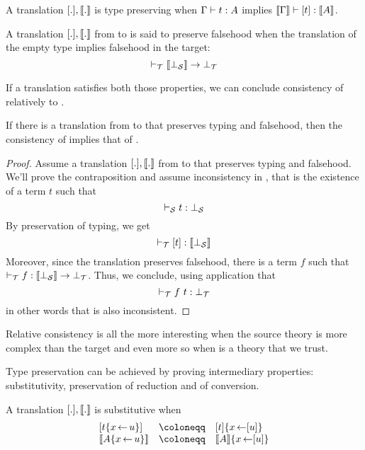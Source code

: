 \begin{definition}
  A translation \([.], \llbracket . \rrbracket\) is type preserving when
  \(\Gamma \vdash t : A\) implies \(\llbracket \Gamma \rrbracket \vdash [t] : \llbracket A \rrbracket\).
\end{definition}

\begin{definition}
  A translation \([.], \llbracket . \rrbracket\) from \cS to \cT is said to preserve
  falsehood when the translation of the empty type implies falsehood in the
  target:
  \[ \vdash_\mathcal{T} \llbracket \bot_\mathcal{S} \rrbracket \to \bot_\mathcal{T} \]
\end{definition}

If a translation satisfies both those properties, we can conclude consistency
of \cS relatively to \cT.

\begin{theorem}
  If there is a translation from \cS to \cT that preserves typing and
  falsehood, then the consistency of \cT implies that of \cS.
\end{theorem}

\begin{proof}
  Assume a translation \([.], \llbracket . \rrbracket\) from \cS to \cT that preserves typing
  and falsehood. We'll prove the contraposition and assume inconsistency in
  \cS, that is the existence of a term \(t\) such that
  \[ \vdash_\mathcal{S} t : \bot_\mathcal{S} \]
  By preservation of typing, we get
  \[ \vdash_\mathcal{T} [t] : \llbracket \bot_\mathcal{S} \rrbracket \]
  Moreover, since the translation preserves falsehood, there is a term \(f\)
  such that \(\vdash_\mathcal{T} f : \llbracket \bot_\mathcal{S} \rrbracket \to \bot_\mathcal{T}\).
  Thus, we conclude, using application that
  \[ \vdash_\mathcal{T} f\ t : \bot_\mathcal{T} \]
  in other words that \cT is also inconsistent.
\end{proof}

Relative consistency is all the more interesting when the source theory is more
complex than the target and even more so when \cT is a theory that we trust.

Type preservation can be achieved by proving intermediary properties:
substitutivity, preservation of reduction and of conversion.

\begin{definition}[Substitutivity]
  A translation \([.], \llbracket . \rrbracket\) is substitutive when
  \[
    \begin{array}{lcl}
      [t\{x \sto u\}] &\coloneqq& [t]\{x \sto [u]\} \\
      \transl{A\{x \sto u\}} &\coloneqq& \transl{A}\{x \sto [u]\} \\
    \end{array}
  \]
\end{definition}


